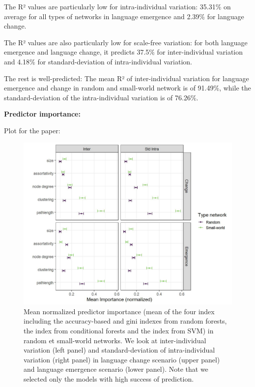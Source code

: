 \documentclass[
]{article}
\begin{document}
The R² values are particularly low for intra-individual variation:
35.31\% on average for all types of networks in language emergence and
2.39\% for language change.

The R² values are also particularly low for scale-free variation: for
both language emergence and language change, it predicts 37.5\% for
inter-individual variation and 4.18\% for standard-deviation of
intra-individual variation.

The rest is well-predicted: The mean R² of inter-individual variation
for language emergence and change in random and small-world network is
of 91.49\%, while the standard-deviation of the intra-individual
variation is of 76.26\%.

\textbf{Predictor importance:}

Plot for the paper:

\begin{figure}[!H]

{\centering \includegraphics{./Figures/unnamed-chunk-115-1} 

}

\caption{Mean normalized predictor importance (mean of the four index including the accuracy-based and gini indexes from random forests, the index from conditional forests and the index from SVM) in random et small-world networks. We look at inter-individual variation (left panel) and standard-deviation of intra-individual variation (right panel) in language change scenario (upper panel) and language emergence scenario (lower panel). Note that we selected only the models with high success of prediction.}\label{fig:unnamed-chunk-115}
\end{figure}
\end{document}
